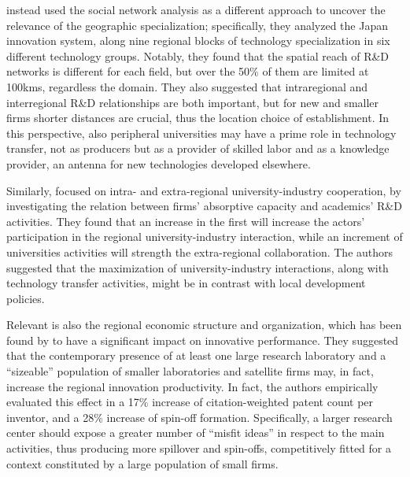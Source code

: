 \citet{Yokura2013} instead used the social network analysis as a different approach to uncover the relevance of the geographic specialization; specifically, they analyzed the Japan innovation system, along nine regional blocks of technology specialization in six different technology groups. Notably, they found that the spatial reach of R\&D networks is different for each field, but over the 50\% of them are limited at 100kms, regardless the domain. They also suggested that intraregional and interregional R\&D relationships are both important, but for new and smaller firms shorter distances are crucial, thus the location choice of establishment. In this perspective, also peripheral universities may have a prime role in technology transfer, not as producers but as a provider of skilled labor and as a knowledge provider, an antenna for new technologies developed elsewhere.

Similarly, \citet{AzagraCaro2010} focused on intra- and extra-regional university-industry cooperation, by investigating the relation between firms' absorptive capacity and academics' R\&D activities. They found that an increase in the first will increase the actors' participation in the regional university-industry interaction, while an increment of universities activities will strength the extra-regional collaboration. The authors suggested that the maximization of university-industry interactions, along with technology transfer activities, might be in contrast with local development policies.

Relevant is also the regional economic structure and organization, which has been found by \citet{Agrawal2014} to have a significant impact on innovative performance. They suggested that the contemporary presence of at least one large research laboratory and a \enquote{sizeable} population of smaller laboratories and satellite firms may, in fact, increase the regional innovation productivity. In fact, the authors empirically evaluated this effect in a 17\% increase of citation-weighted patent count per inventor, and a 28\% increase of spin-off formation. Specifically, a larger research center should expose a greater number of \enquote{misfit ideas} in respect to the main activities, thus producing more spillover and spin-offs, competitively fitted for a context constituted by a large population of small firms.

